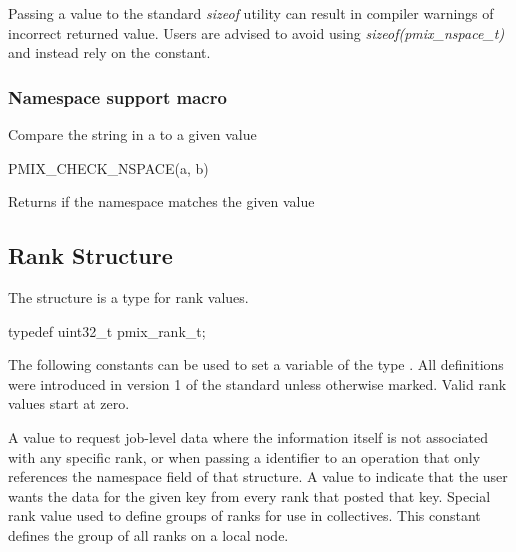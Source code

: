 Passing a  value to the standard \textit{sizeof} utility can result in compiler warnings of incorrect returned value. Users are advised to avoid using \textit{sizeof(pmix_nspace_t)} and instead rely on the  constant.
\adviceuserend

\subsubsection{Namespace support macro}

Compare the string in a  to a given value

\cspecificstart
\begin{codepar}
PMIX_CHECK_NSPACE(a, b)
\end{codepar}
\cspecificend

\begin{arglist}
\end{arglist}

Returns  if the namespace matches the given value


\subsection{Rank Structure}

The  structure is a  type for rank values.

\cspecificstart
\begin{codepar}
typedef uint32_t pmix_rank_t;
\end{codepar}
\cspecificend

The following constants can be used to set a variable of the type . All definitions were introduced in version 1 of the standard unless otherwise marked. Valid rank values start at zero.

\begin{constantdesc}
%
A value to request job-level data where the information itself is not associated with any specific rank, or when passing a  identifier to an operation that only references the namespace field of that structure.
%
A value to indicate that the user wants the data for the given key from every rank that posted that key.
%
Special rank value used to define groups of ranks for use in collectives.
This constant defines the group of all ranks on a local node.
%
\end{constantdesc}


